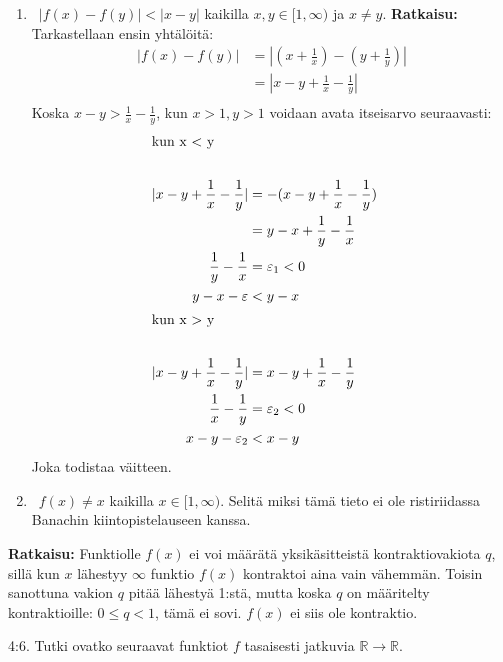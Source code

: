 \documentclass[12pt,a4paper,leqno]{amsart}
\begin{document}
\begin{enumerate}

\item \  $\vert f(x) - f(y) \vert < \vert x - y \vert$ kaikilla $x, y \in [1, \infty)$ ja $x \neq y$.
\textbf{Ratkaisu: }
Tarkastellaan ensin yhtälöitä:
\begin{align*}
    | f(x) - f(y) | &= | (x + \frac{1}{x}) - (y + \frac{1}{y}) | \\
                  &= | x - y + \frac{1}{x} - \frac{1}{y} | \\
\end{align*}
Koska $x - y > \frac{1}{x} - \frac{1}{y}$, kun $x >1, y > 1$ voidaan avata itseisarvo seuraavasti:
\begin{align*}
                \intertext{kun x < y} \\
| x - y + \frac{1}{x} - \frac{1}{y} | &= -(x - y + \frac{1}{x} - \frac{1}{y}) \\
&= y - x + \frac{1}{y} - \frac{1}{x} \\
\frac{1}{y} - \frac{1}{x} &= \varepsilon_1 < 0 \\
y - x - \varepsilon &< y - x \\
\intertext{kun x > y}\\
| x - y + \frac{1}{x} - \frac{1}{y} | &= x - y + \frac{1}{x} - \frac{1}{y}\\
        \frac{1}{x} - \frac{1}{y} &= \varepsilon_2 < 0 \\
x - y - \varepsilon_2 &< x - y
\end{align*}
Joka todistaa väitteen.
\smallskip

\item \  $f(x) \neq x$ kaikilla $x \in [1, \infty)$.  Selitä miksi tämä tieto ei ole ristiriidassa Banachin kiintopistelauseen kanssa.

\end{enumerate}

\textbf{Ratkaisu: }
Funktiolle $f(x)$ ei voi määrätä yksikäsitteistä kontraktiovakiota $q$, sillä kun $x$ lähestyy $\infty$ funktio $f(x)$ kontraktoi aina vain vähemmän. Toisin sanottuna vakion $q$ pitää lähestyä 1:stä, mutta koska $q$ on määritelty kontraktioille: $0 \leq q < 1$, tämä ei sovi. $f(x)$ ei siis ole kontraktio.
\bigskip

4:6.  Tutki ovatko seuraavat funktiot $f$ tasaisesti jatkuvia $\mathbb R \to \mathbb R$.
\end{document}
